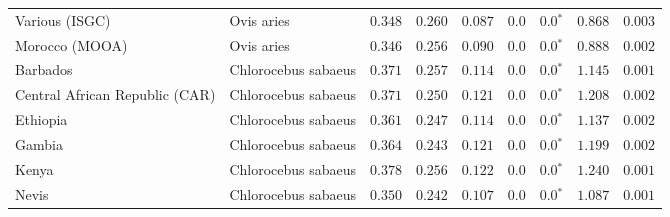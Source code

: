 \begin{center}
\begin{adjustbox}{width = 1\textwidth}
\begin{tabular}{|l|l|r|r|r|r|r|r|r|}
                 Various (ISGC) &           Ovis aries &                                        $ 0.348$ &                                           $ 0.260$ &                      $ 0.087$ &            $0.0$ &                  $\bm{0.0{^*}}$ &                                           $ 0.868$ &           $ 0.003$ \\
                 Morocco (MOOA) &           Ovis aries &                                        $ 0.346$ &                                           $ 0.256$ &                      $ 0.090$ &            $0.0$ &                  $\bm{0.0{^*}}$ &                                           $ 0.888$ &           $ 0.002$ \\
                       Barbados &  Chlorocebus sabaeus &                                        $ 0.371$ &                                           $ 0.257$ &                      $ 0.114$ &            $0.0$ &                  $\bm{0.0{^*}}$ &                                           $ 1.145$ &           $ 0.001$ \\
 Central African Republic (CAR) &  Chlorocebus sabaeus &                                        $ 0.371$ &                                           $ 0.250$ &                      $ 0.121$ &            $0.0$ &                  $\bm{0.0{^*}}$ &                                           $ 1.208$ &           $ 0.002$ \\
                       Ethiopia &  Chlorocebus sabaeus &                                        $ 0.361$ &                                           $ 0.247$ &                      $ 0.114$ &            $0.0$ &                  $\bm{0.0{^*}}$ &                                           $ 1.137$ &           $ 0.002$ \\
                         Gambia &  Chlorocebus sabaeus &                                        $ 0.364$ &                                           $ 0.243$ &                      $ 0.121$ &            $0.0$ &                  $\bm{0.0{^*}}$ &                                           $ 1.199$ &           $ 0.002$ \\
                          Kenya &  Chlorocebus sabaeus &                                        $ 0.378$ &                                           $ 0.256$ &                      $ 0.122$ &            $0.0$ &                  $\bm{0.0{^*}}$ &                                           $ 1.240$ &           $ 0.001$ \\
                          Nevis &  Chlorocebus sabaeus &                                        $ 0.350$ &                                           $ 0.242$ &                      $ 0.107$ &            $0.0$ &                  $\bm{0.0{^*}}$ &                                           $ 1.087$ &           $ 0.001$ \\

\end{tabular}
\end{adjustbox}
\end{center}
